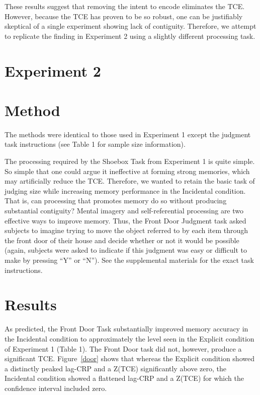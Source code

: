 \documentclass[jou,natbib]{apa6} %
\begin{document}
These results suggest that removing the intent to encode eliminates the TCE. However, because the TCE has proven to be so robust, one can be justifiably skeptical of a single experiment showing lack of contiguity. Therefore, we attempt to replicate the finding in Experiment 2 using a slightly different processing task.

\section{Experiment 2}
\section{Method}

The methods were identical to those used in Experiment 1 except the judgment task instructions (see Table 1 for sample size information).

The processing required by the Shoebox Task from Experiment 1 is quite simple. So simple that one could argue it ineffective at forming strong memories, which may artificially reduce the TCE. Therefore, we wanted to retain the basic task of judging size while increasing memory performance in the Incidental condition. That is, can processing that promotes memory do so without producing substantial contiguity? Mental imagery and self-referential processing are two effective ways to improve memory. Thus, the Front Door Judgment task asked subjects to imagine trying to move the object referred to by each item through the front door of their house and decide whether or not it would be possible (again, subjects were asked to indicate if this judgment was easy or difficult to make by pressing ``Y'' or ``N'').
See the supplemental materials for the exact task instructions.

\section{Results}
As predicted, the Front Door Task substantially improved memory accuracy in the Incidental condition to approximately the level seen in the Explicit condition of Experiment 1 (Table 1). The Front Door task did not, however, produce a significant TCE. Figure~\ref{door} shows that whereas the Explicit condition showed a distinctly peaked lag-CRP and a Z(TCE) significantly above zero, the Incidental condition showed a flattened lag-CRP and a Z(TCE) for which the confidence interval included zero.
\end{document}
